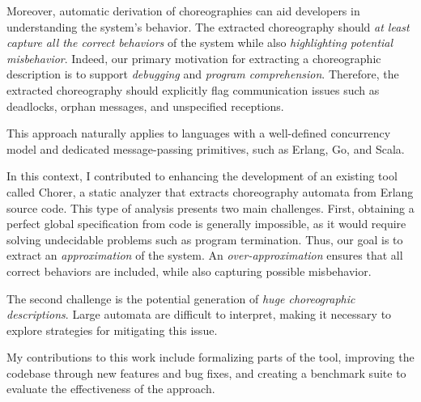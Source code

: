 Moreover, automatic derivation of choreographies can aid developers in  
understanding the system's behavior. The extracted choreography should  
\textit{at least capture all the correct behaviors} of the system while also  
\textit{highlighting potential misbehavior}. Indeed, our primary motivation  
for extracting a choreographic description is to support \textit{debugging}  
and \textit{program comprehension}. Therefore, the extracted choreography  
should explicitly flag communication issues such as deadlocks, orphan  
messages, and unspecified receptions.  

This approach naturally applies to languages with a well-defined concurrency  
model and dedicated message-passing primitives, such as Erlang, Go, and Scala.  

In this context, I contributed to enhancing the development of an existing  
tool called Chorer, a static analyzer that extracts choreography automata  
from Erlang source code. This type of analysis presents two main challenges.  
First, obtaining a perfect global specification from code is generally  
impossible, as it would require solving undecidable problems such as program  
termination. Thus, our goal is to extract an \textit{approximation} of the  
system. An \textit{over-approximation} ensures that all correct behaviors are  
included, while also capturing possible misbehavior.  

The second challenge is the potential generation of \textit{huge choreographic  
descriptions}. Large automata are difficult to interpret, making it necessary  
to explore strategies for mitigating this issue.  

My contributions to this work include formalizing parts of the tool, improving  
the codebase through new features and bug fixes, and creating a benchmark suite  
to evaluate the effectiveness of the approach.